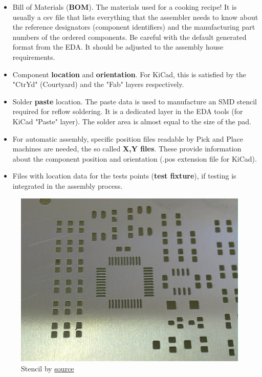 \documentclass[final]{cubedoc}
\begin{document}
	\begin{itemize}	
		\item Bill of Materials (\textbf{BOM}). The materials used for a cooking recipe! It is usually a csv file that lists everything that the assembler needs to know about the reference designators (component identifiers) and the manufacturing part numbers of the ordered components. Be careful with the default generated format from the EDA. It should be adjusted to the assembly house requirements.
		\item Component \textbf{location} and \textbf{orientation}. For KiCad, this is satisfied by the "CtrYd" (Courtyard) and the "Fab" layers respectively.
		\item Solder \textbf{paste} location. The paste data is used to manufacture an SMD stencil required for reflow soldering. It is a dedicated layer in the EDA tools (for KiCad "Paste" layer). The solder area is almost equal to the size of the pad.
		\item For automatic assembly, specific position files readable by Pick and Place machines are needed, the so called \textbf{X,Y files}. These provide information about the component position and orientation (.pos extension file for KiCad).
		\item Files with location data for the tests points (\textbf{test fixture}), if testing is integrated in the assembly process.
	\end{itemize}
	
	
	\begin{figure}[h!]
		\centering
		\includegraphics[keepaspectratio, height = 0.25\textheight, width = \textwidth]{assets/solder_paste_stencil.jpg}
		\caption{Stencil by \href{https://www.itmconsulting.com/?product=stencilpro-3-0-stencil-aperture-calculator}{source}}
	\end{figure}
	
\end{document}
